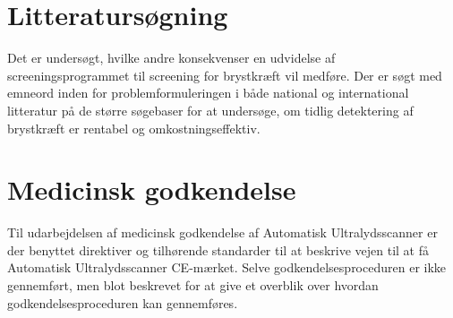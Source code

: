 \section{Litteratursøgning} 
Det er undersøgt, hvilke andre konsekvenser en udvidelse af screeningsprogrammet til screening for brystkræft vil medføre. Der er søgt med emneord inden for problemformuleringen i både national og international litteratur på de større søgebaser for at undersøge, om tidlig detektering af brystkræft er rentabel og omkostningseffektiv. 

\section{Medicinsk godkendelse}
Til udarbejdelsen af medicinsk godkendelse af Automatisk Ultralydsscanner er der benyttet direktiver og tilhørende standarder til at beskrive vejen til at få Automatisk Ultralydsscanner CE-mærket. Selve godkendelsesproceduren er ikke gennemført, men blot beskrevet for at give et overblik over hvordan godkendelsesproceduren kan gennemføres. 

